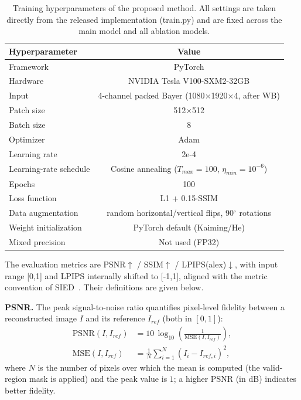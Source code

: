 \documentclass[remotesensing,article,accept,moreauthors]{Definitions/mdpi}
\begin{document}
\begin{table}[H]
\centering
\caption{Training hyperparameters of the proposed method. All settings are taken directly from the released implementation (train.py) and are fixed across the main model and all ablation models.}
\label{tab:hyper}
\begin{tabularx}{\textwidth}{lC}
\toprule
Hyperparameter & Value \\
\midrule
Framework & PyTorch \\
Hardware & NVIDIA Tesla V100-SXM2-32GB \\
Input & 4-channel packed Bayer (1080$\times$1920$\times$4, after WB) \\
Patch size & 512$\times$512 \\
Batch size & 8 \\
Optimizer & Adam \\
Learning rate & 2e-4 \\
Learning-rate schedule & Cosine annealing ($T_{max}{=}100$, $\eta_{min}{=}10^{-6}$) \\
Epochs & 100 \\
Loss function & L1 + 0.15$\cdot$SSIM \\
Data augmentation & random horizontal/vertical flips, 90$^\circ$ rotations \\
Weight initialization & PyTorch default (Kaiming/He) \\
Mixed precision & Not used (FP32) \\
\bottomrule
\end{tabularx}
\end{table}

The evaluation metrics are PSNR$\uparrow$ / SSIM$\uparrow$ / LPIPS(alex)$\downarrow$, with input range [0,1] and LPIPS internally shifted to [-1,1], aligned with the metric convention of SIED~\citep{jiang2025sied}. Their definitions are given below.

\textbf{PSNR.} The peak signal-to-noise ratio quantifies pixel-level fidelity between a reconstructed image $I$ and its reference $I_{ref}$ (both in $[0,1]$):
\begin{align}
\mathrm{PSNR}(I, I_{ref}) &= 10\,\log_{10}\!\left(\frac{1}{\mathrm{MSE}(I, I_{ref})}\right), \label{eq:psnr} \\
\mathrm{MSE}(I, I_{ref}) &= \frac{1}{N}\sum_{i=1}^{N}\left(I_i - I_{ref,i}\right)^{2}, \label{eq:mse}
\end{align}
where $N$ is the number of pixels over which the mean is computed (the valid-region mask is applied) and the peak value is $1$; a higher PSNR (in dB) indicates better fidelity.
\end{document}
